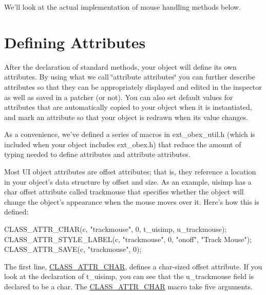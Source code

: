 We'll look at the actual implementation of mouse handling methods below.\hypertarget{chapter_ui_anatomy_chapter_ui_anatomy_attributes}{}\section{Defining Attributes}\label{chapter_ui_anatomy_chapter_ui_anatomy_attributes}
After the declaration of standard methods, your object will define its own attributes. By using what we call \char`\"{}attribute attributes\char`\"{} you can further describe attributes so that they can be appropriately displayed and edited in the inspector as well as saved in a patcher (or not). You can also set default values for attributes that are automatically copied to your object when it is instantiated, and mark an attribute so that your object is redrawn when its value changes.

As a convenience, we've defined a series of macros in ext\_\-obex\_\-util.h (which is included when your object includes ext\_\-obex.h) that reduce the amount of typing needed to define attributes and attribute attributes.

Most UI object attributes are offset attributes; that is, they reference a location in your object's data structure by offset and size. As an example, uisimp has a char offset attribute called trackmouse that specifies whether the object will change the object's appearance when the mouse moves over it. Here's how this is defined:


\begin{DoxyCode}
    CLASS_ATTR_CHAR(c, "trackmouse", 0, t_uisimp, u_trackmouse);
    CLASS_ATTR_STYLE_LABEL(c, "trackmouse", 0, "onoff", "Track Mouse");
    CLASS_ATTR_SAVE(c, "trackmouse", 0);
\end{DoxyCode}


The first line, \hyperlink{group__attr_ga155d0006cea5a22fe0832a9fa52b2814}{CLASS\_\-ATTR\_\-CHAR}, defines a char-\/sized offset attribute. If you look at the declaration of t\_\-uisimp, you can see that the u\_\-trackmouse field is declared to be a char. The \hyperlink{group__attr_ga155d0006cea5a22fe0832a9fa52b2814}{CLASS\_\-ATTR\_\-CHAR} macro take five arguments.


